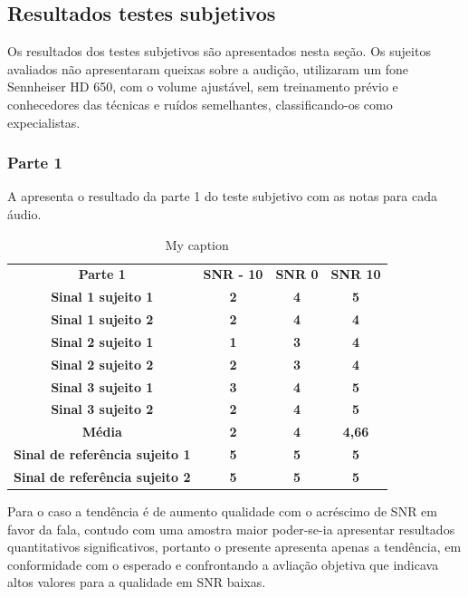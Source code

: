 \subsection{Resultados testes subjetivos}
Os resultados dos testes subjetivos são apresentados nesta seção. Os sujeitos avaliados não apresentaram queixas sobre a audição, utilizaram um fone Sennheiser HD 650, com o volume ajustável, sem treinamento prévio e conhecedores das técnicas e ruídos semelhantes, classificando-os como expecialistas.

\subsubsection{Parte 1}
A  apresenta o resultado da parte 1 do teste subjetivo com as notas para cada áudio.
\begin{table}[H]
\centering
\caption{My caption}
\label{t1s}
\begin{tabular}{cccc}
\textbf{Parte 1} & \textbf{SNR - 10} & \textbf{SNR 0} & \textbf{SNR 10} \\
\textbf{Sinal 1 sujeito 1} & \textbf{2} & \textbf{4} & \textbf{5} \\
\textbf{Sinal 1 sujeito 2} & \textbf{2} & \textbf{4} & \textbf{4} \\
\textbf{Sinal 2 sujeito 1} & \textbf{1} & \textbf{3} & \textbf{4} \\
\textbf{Sinal 2 sujeito 2} & \textbf{2} & \textbf{3} & \textbf{4} \\
\textbf{Sinal 3 sujeito 1} & \textbf{3} & \textbf{4} & \textbf{5} \\
\textbf{Sinal 3 sujeito 2} & \textbf{2} & \textbf{4} & \textbf{5} \\
\textbf{Média} & \textbf{2} & \textbf{4} &\textbf{4,66}\\
\textbf{Sinal de referência sujeito 1} & \textbf{5} & \textbf{5} & \textbf{5} \\
\textbf{Sinal de referência sujeito 2} & \textbf{5} & \textbf{5} & \textbf{5}   
 
\end{tabular}%
\end{table}


Para o caso a tendência é de aumento qualidade com o acréscimo de SNR em favor da fala, contudo com uma amostra maior poder-se-ia apresentar resultados quantitativos significativos, portanto o presente apresenta apenas a tendência, em conformidade com o esperado e confrontando a avliação objetiva que indicava altos valores para a qualidade em SNR baixas.

